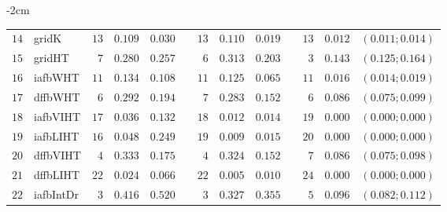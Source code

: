 \begin{table*}[!htbp]
\begin{adjustwidth*}{}{-2cm}
\begin{tabular}{@{}rlrrrrrrrrrcc@{}}
\footnotesize{$14$} & \footnotesize{gridK    } & \footnotesize{$13$} & \footnotesize{$0.109$} & \footnotesize{$0.030$} && \footnotesize{$13$} & \footnotesize{$0.110$} & \footnotesize{$0.019$} && \footnotesize{$13$} & \footnotesize{$0.012$} & \footnotesize{$(0.011;0.014)$} \\
\footnotesize{$15$} & \footnotesize{gridHT   } & \footnotesize{$7 $} & \footnotesize{$0.280$} & \footnotesize{$0.257$} && \footnotesize{$6 $} & \footnotesize{$0.313$} & \footnotesize{$0.203$} && \footnotesize{$3 $} & \footnotesize{$0.143$} & \footnotesize{$(0.125;0.164)$} \\
\footnotesize{$16$} & \footnotesize{iafbWHT  } & \footnotesize{$11$} & \footnotesize{$0.134$} & \footnotesize{$0.108$} && \footnotesize{$11$} & \footnotesize{$0.125$} & \footnotesize{$0.065$} && \footnotesize{$11$} & \footnotesize{$0.016$} & \footnotesize{$(0.014;0.019)$} \\
\footnotesize{$17$} & \footnotesize{dffbWHT  } & \footnotesize{$6 $} & \footnotesize{$0.292$} & \footnotesize{$0.194$} && \footnotesize{$7 $} & \footnotesize{$0.283$} & \footnotesize{$0.152$} && \footnotesize{$6 $} & \footnotesize{$0.086$} & \footnotesize{$(0.075;0.099)$} \\
\footnotesize{$18$} & \footnotesize{iafbVIHT } & \footnotesize{$17$} & \footnotesize{$0.036$} & \footnotesize{$0.132$} && \footnotesize{$18$} & \footnotesize{$0.012$} & \footnotesize{$0.014$} && \footnotesize{$19$} & \footnotesize{$0.000$} & \footnotesize{$(0.000;0.000)$} \\
\footnotesize{$19$} & \footnotesize{iafbLIHT } & \footnotesize{$16$} & \footnotesize{$0.048$} & \footnotesize{$0.249$} && \footnotesize{$19$} & \footnotesize{$0.009$} & \footnotesize{$0.015$} && \footnotesize{$20$} & \footnotesize{$0.000$} & \footnotesize{$(0.000;0.000)$} \\
\footnotesize{$20$} & \footnotesize{dffbVIHT } & \footnotesize{$4 $} & \footnotesize{$0.333$} & \footnotesize{$0.175$} && \footnotesize{$4 $} & \footnotesize{$0.324$} & \footnotesize{$0.152$} && \footnotesize{$7 $} & \footnotesize{$0.086$} & \footnotesize{$(0.075;0.098)$} \\
\footnotesize{$21$} & \footnotesize{dffbLIHT } & \footnotesize{$22$} & \footnotesize{$0.024$} & \footnotesize{$0.066$} && \footnotesize{$22$} & \footnotesize{$0.005$} & \footnotesize{$0.010$} && \footnotesize{$24$} & \footnotesize{$0.000$} & \footnotesize{$(0.000;0.000)$} \\
\footnotesize{$22$} & \footnotesize{iafbIntDr} & \footnotesize{$3 $} & \footnotesize{$0.416$} & \footnotesize{$0.520$} && \footnotesize{$3 $} & \footnotesize{$0.327$} & \footnotesize{$0.355$} && \footnotesize{$5 $} & \footnotesize{$0.096$} & \footnotesize{$(0.082;0.112)$} \\

\end{tabular}
\end{adjustwidth*}
\end{table*}
